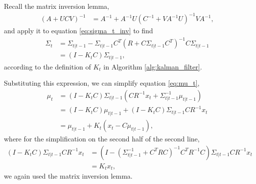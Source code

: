 \documentclass[14pt]{extreport}
\begin{document}
Recall the matrix inversion lemma,
\begin{align*}
\left(A + UCV\right)^{-1} &= A^{-1} + A^{-1}U\left(C^{-1} + VA^{-1}U\right)^{-1}VA^{-1},
\end{align*}
and apply it to equation \ref{eq:sigma_t_inv} to find
\begin{align*}
  \Sigma_{t} &= \Sigma_{t \vert t - 1} - \Sigma_{t \vert t - 1}C^T\left(R + C \Sigma_{t \vert t - 1}C^{T}\right)^{-1}C\Sigma_{t \vert t - 1} \\
  &= \left(I - K_{t}C\right)\Sigma_{t \vert t - 1},
\end{align*}
according to the definition of $K_{t}$ in Algorithm
\ref{alg:kalman_filter}.

Substituting this expression, we can simplify equation \ref{eq:mu_t},
\begin{align*}
  \mu_{t} &= \left(I - K_{t} C\right)\Sigma_{t \vert t - 1}\left(C R^{-1}x_{t} + \Sigma_{t \vert t - 1}^{-1} \mu_{t \vert t - 1}\right) \\
  &= \left(I - K_{t}C\right)\mu_{t \vert t - 1} + \left(I - K_{t} C\right)\Sigma_{t \vert t - 1}C R^{-1} x_{t} \\
  &= \mu_{t \vert t - 1} + K_{t}\left(x_{t} - C\mu_{t \vert t- 1}\right),
\end{align*}
where for the simplification on the second half of the second line,
\begin{align*}
  \left(I - K_{t}C\right)\Sigma_{t \vert t - 1} C R^{-1} x_{t} &= \left(I - \left(\Sigma_{t \vert t - 1}^{-1} + C^{T} R C\right)^{-1}C^{T}R^{-1}C\right)\Sigma_{t \vert t - 1}C R^{-1} x_{t} \\
  &= K_{t}x_{t},
\end{align*}
we again used the matrix inversion lemma.
\end{document}
